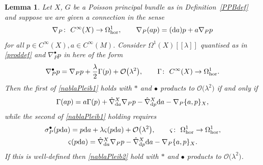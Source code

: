 \documentclass[10pt,a4paper]{amsart}
\numberwithin{equation}{section}
\newtheorem{Lemma}[Theorem]{Lemma}
\newcommand{\<}{{\langle}}
\renewcommand{\>}{{\rangle}}
\newcommand{\extd}{{\rm d}}
\begin{document}
\begin{Lemma}\label{nablabullet} Let $X$, $G$ be a Poisson principal bundle as in Definition~{\rm \ref{PPBdef}} and suppose we are given a connection in the sense
\[ \nabla_P\colon \ C^\infty(X)\to \Omega^1_{\rm hor},\qquad \nabla_P(ap)=(\extd a)p +a\nabla_Pp\]
for all $p\in C^\infty(X), a\in C^\infty(M)$. Consider $\Omega^1(X)[[\lambda]]$ quantised as in \eqref{proddef} and $\nabla^\bullet_Pp$ in here of the form
\[ \nabla^\bullet_{P}p= \nabla_Pp + \frac{\lambda}{2} \Gamma(p)+ \mathcal{O}\big(\lambda^2\big),\qquad \Gamma\colon \ C^\infty(X)\to \Omega^1_{\rm hor}.\]
Then the first of \eqref{nablaPleib1} holds with $*$ and $\bullet$ products to $\mathcal{O}\big(\lambda^2\big)$ if and only if
\begin{equation}\label{Gamma} \Gamma(ap)=a\Gamma(p)+\hat\nabla^X_{\extd a}\nabla_Pp-\hat\nabla^X_{\extd p}\extd a-\nabla_P\{a,p\}_X,\end{equation}
while the second of \eqref{nablaPleib1} holding requires
\begin{gather*} \sigma^\bullet_P(p\extd a) =p\extd a+\lambda\varsigma(p\extd a)+\mathcal{O}\big(\lambda^2\big),\qquad \varsigma\colon \ \Omega^1_{\rm hor}\to \Omega^1_{\rm hor},\nonumber\\
\varsigma(p\extd a) =\hat\nabla^X_{\extd a}\nabla_Pp-\hat\nabla^X_{\extd p}\extd a-\nabla_P\{a,p\}_X. \end{gather*}
If this is well-defined then \eqref{nablaPleib2} hold with $*$ and $\bullet$ products to $\mathcal{O}\big(\lambda^2\big)$. \end{Lemma}
\end{document}
